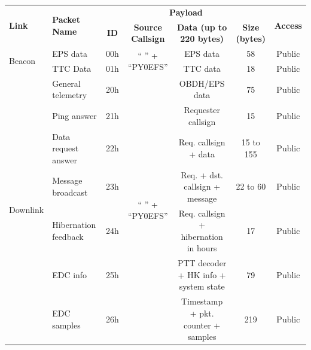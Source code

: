 \begin{landscape}
    \begin{table}[ht]
        \centering
        \begin{tabular}{llccccc}
            \toprule[1.5pt]
            \multirow{2}{*}{\textbf{Link}} & \multirow{2}{*}{\textbf{Packet Name}} & \multicolumn{4}{c}{\textbf{Payload}} & \multirow{2}{*}{\textbf{Access}} \\
            \cmidrule{3-6}
                                      &                       & \textbf{ID}  & \textbf{Source Callsign}   & \textbf{Data (up to 220 bytes)}            & \textbf{Size (bytes)} & \\
            \midrule
            \multirow{2}{*}{Beacon}   & EPS data              & 00h & \multirow{2}{*}{`` '' + ``PY0EFS''} & EPS data                                   & 58                    & Public \\
                                      & TTC Data              & 01h &                                     & TTC data                                   & 18                    & Public \\
            \midrule
            \multirow{8}{*}{Downlink} & General telemetry     & 20h & \multirow{8}{*}{`` '' + ``PY0EFS''} & OBDH/EPS data                              & 75                    & Public \\
                                      & Ping answer           & 21h &                                     & Requester callsign                         & 15                    & Public \\
                                      & Data request answer   & 22h &                                     & Req. callsign + data                       & 15 to 155             & Public \\
                                      & Message broadcast     & 23h &                                     & Req. + dst. callsign + message             & 22 to 60              & Public \\
                                      & Hibernation feedback  & 24h &                                     & Req. callsign + hibernation in hours       & 17                    & Public \\
                                      & EDC info              & 25h &                                     & PTT decoder + HK info + system state       & 79                    & Public \\
                                      & EDC samples           & 26h &                                     & Timestamp + pkt. counter + samples         & 219                   & Public \\

\end{tabular}
\end{table}
\end{landscape}
